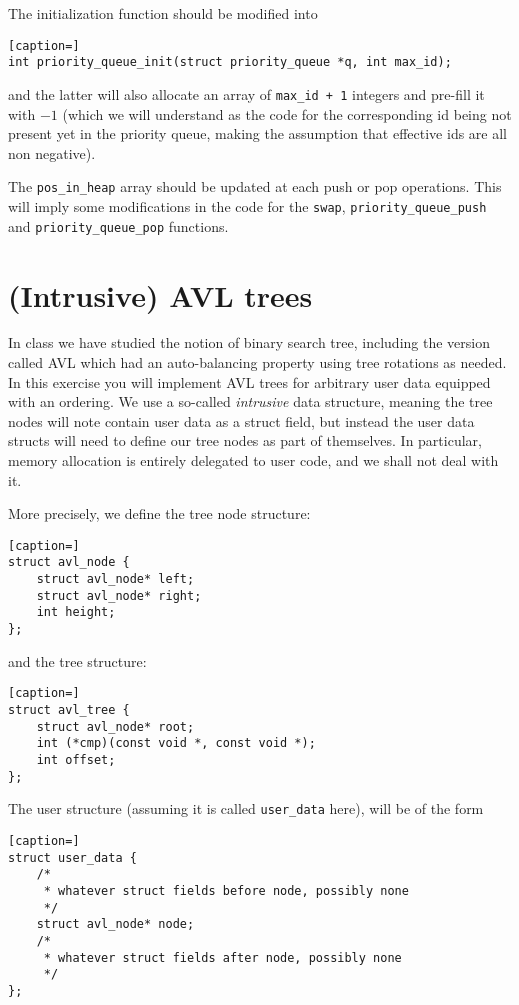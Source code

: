 \documentclass[a4paper,11pt]{article}
\begin{document}
The initialization function should be modified into
\begin{lstlisting}[caption=]
int priority_queue_init(struct priority_queue *q, int max_id);
\end{lstlisting}
and the latter will also allocate an array of {\tt max\_id + 1} integers and
pre-fill it with $-1$ (which we will understand as the code for the corresponding
id being not present yet in the priority queue, making the assumption that effective 
ids are all non negative).

The {\tt pos\_in\_heap} array should be updated at each push or pop operations. 
This will imply some modifications in the code for the {\tt swap}, 
{\tt priority\_queue\_push} and {\tt priority\_queue\_pop} functions.
 
\section{(Intrusive) AVL trees}


In class we have studied the notion of binary search tree, including the version
called AVL which had an auto-balancing property using tree rotations as needed.
In this exercise you will implement AVL trees for arbitrary user data equipped
with an ordering. We use a so-called {\it intrusive} data structure, meaning the
tree nodes will note contain user data as a struct field, but instead the user
data structs will need to define our tree nodes as part of themselves. In
particular, memory allocation is entirely delegated to user code, and we shall not deal with it.

\medskip 

More precisely, we define the tree node structure: 

\begin{lstlisting}[caption=]
struct avl_node {
    struct avl_node* left;
    struct avl_node* right;
    int height;	
};
\end{lstlisting}

and the tree structure:

\begin{lstlisting}[caption=]
struct avl_tree {
    struct avl_node* root;
    int (*cmp)(const void *, const void *);
    int offset;	
};
\end{lstlisting}

The user structure (assuming it is called {\tt user\_data} here), will be of the form 

\begin{lstlisting}[caption=]
struct user_data {
    /*
     * whatever struct fields before node, possibly none
     */
    struct avl_node* node;
    /*
     * whatever struct fields after node, possibly none
     */
};
\end{lstlisting}
\end{document}

